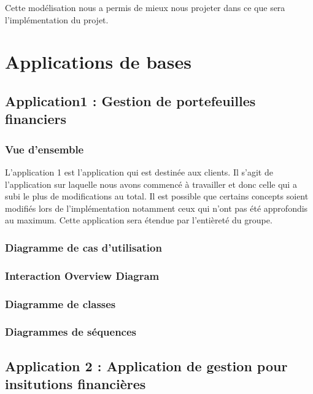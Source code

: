 \documentclass{article}
\begin{document}
		\bigskip

		Cette modélisation nous a permis de mieux nous projeter dans ce que sera l'implémentation du projet.
\section{Applications de bases}

	\subsection{Application1 : Gestion de portefeuilles financiers}

		\subsubsection{Vue d'ensemble}
			L'application 1 est l'application qui est destinée aux clients. Il s'agit de l'application sur
			laquelle nous avons commencé à travailler et donc celle qui a subi le plus de modifications au total.
			Il est possible que certains concepts soient modifiés lors de l'implémentation notamment ceux qui 
			n'ont pas été approfondis au maximum. Cette application sera étendue par l'entièreté du groupe.

		\subsubsection{Diagramme de cas d'utilisation}
				
				
		\subsubsection{Interaction Overview Diagram}
		
				
		
		\subsubsection{Diagramme de classes}
				
		\subsubsection{Diagrammes de séquences}

                
		
	\subsection{Application 2 : Application de gestion pour insitutions financières}
\end{document}
